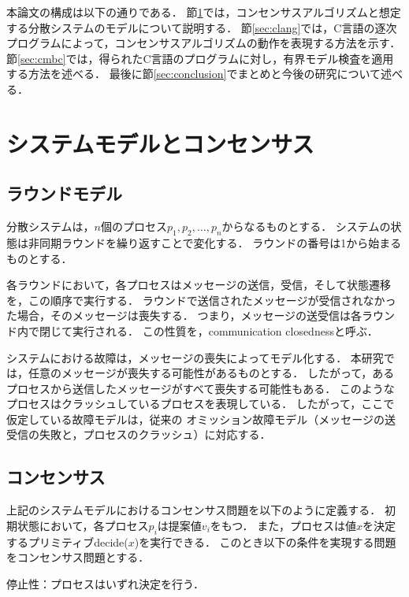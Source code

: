 \documentclass[technicalreport]{ieicej}
\theoremstyle{plain}
\begin{document}
本論文の構成は以下の通りである．
節\ref{sec:consensus}では，コンセンサスアルゴリズムと想定する分散システムのモデルについて説明する．
節\ref{sec:clang}では，C言語の逐次プログラムによって，コンセンサスアルゴリズムの動作を表現する方法を示す．
節\ref{sec:cmbc}では，得られたC言語のプログラムに対し，有界モデル検査を適用する方法を述べる．
最後に節\ref{sec:conclusion}でまとめと今後の研究について述べる．

\section{システムモデルとコンセンサス}\label{sec:consensus}

\subsection{ラウンドモデル}
分散システムは，$n$個のプロセス$p_1, p_2, \ldots, p_n$からなるものとする．
システムの状態は非同期ラウンドを繰り返すことで変化する．
ラウンドの番号は1から始まるものとする．

各ラウンドにおいて，各プロセスはメッセージの送信，受信，そして状態遷移を，この順序で実行する．
ラウンドで送信されたメッセージが受信されなかった場合，そのメッセージは喪失する．
つまり，メッセージの送受信は各ラウンド内で閉じて実行される．
この性質を，communication closednessと呼ぶ\cite{DamianDMW19}．

システムにおける故障は，メッセージの喪失によってモデル化する．
本研究では，任意のメッセージが喪失する可能性があるものとする．
したがって，あるプロセスから送信したメッセージがすべて喪失する可能性もある．
このようなプロセスはクラッシュしているプロセスを表現している．
したがって，ここで仮定している故障モデルは，従来の
オミッション故障モデル（メッセージの送受信の失敗と，プロセスのクラッシュ）に対応する．

\subsection{コンセンサス}

上記のシステムモデルにおけるコンセンサス問題を以下のように定義する．
初期状態において，各プロセス$p_i$は提案値$v_i$をもつ．
また，プロセスは値$x$を決定するプリミティブdecide($x$)を実行できる．
このとき以下の条件を実現する問題をコンセンサス問題とする．

停止性：プロセスはいずれ決定を行う．
\end{document}
